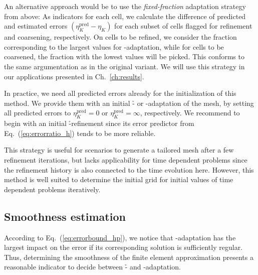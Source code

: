 An alternative approach would be to use the \textit{fixed-fraction} adaptation strategy from above: As indicators for each cell, we calculate the difference of predicted and estimated errors $(\eta_K^\text{pred} - \eta_K)$ for each subset of cells flagged for refinement and coarsening, respectively. On cells to be refined, we consider the fraction corresponding to the largest values for \p-adaptation, while for cells to be coarsened, the fraction with the lowest values will be picked. This conforms to the same argumentation as in the original variant. We will use this strategy in our applications presented in Ch.~\ref{ch:results}.

In practice, we need all predicted errors already for the initialization of this method. We provide them with an initial \h- or \p-adaptation of the mesh, by setting all predicted errors to $\eta_K^\text{pred} = 0$ or $\eta_K^\text{pred} = \infty$, respectively. We recommend to begin with an initial \h-refinement since its error predictor from Eq.~(\ref{eq:errorratio_h}) tends to be more reliable.

This strategy is useful for scenarios to generate a tailored mesh after a few refinement iterations, but lacks applicability for time dependent problems since the refinement history is also connected to the time evolution here. However, this method is well suited to determine the initial grid for initial values of time dependent problems iteratively.



\subsection{Smoothness estimation}
\label{ssec:smoothness}

According to Eq.~(\ref{eq:errorbound_hp}), we notice that \p-adaptation has the largest impact on the error if its corresponding solution is sufficiently regular. Thus, determining the smoothness of the finite element approximation presents a reasonable indicator to decide between \h- and \p-adaptation.

